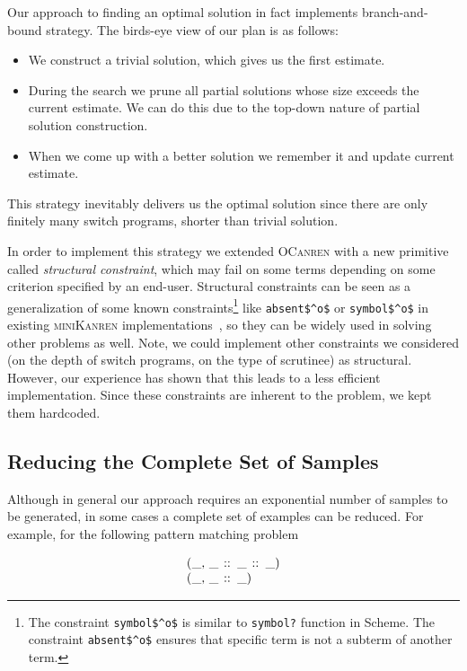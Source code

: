 Our approach to finding an optimal solution in fact implements branch-and-bound strategy. The birds-eye view of our plan is as follows:

\begin{itemize}
\item We construct a trivial solution, which gives us the first estimate.
\item During the search we prune all partial solutions whose size exceeds the current estimate. We can do this due to the top-down nature of partial solution construction.
\item When we come up with a better solution we remember it and update current estimate.
\end{itemize}

\noindent This strategy inevitably delivers us the optimal solution since there are only finitely many switch programs, shorter than trivial solution.

In order to implement this strategy we extended \textsc{OCanren} with a new primitive called \emph{structural constraint}, which may
fail on some terms depending on some criterion specified by an end-user. Structural constraints can be seen as a generalization of
some known constraints\footnote{The constraint  \lstinline|symbol$^o$| is similar to \lstinline{symbol?} function in Scheme. The constraint \lstinline|absent$^o$| ensures that specific term is not a subterm of another term.}
 like \lstinline|absent$^o$| or \lstinline|symbol$^o$|
in existing \textsc{miniKanren} implementations~\cite{Untagged}, 
so they can be widely used in solving other problems as well. Note, we could implement other constraints we considered (on the
depth of switch programs, on the type of scrutinee) as structural.
However, our experience has shown that this leads to
a less efficient implementation. Since these constraints are inherent to the problem, we kept them hardcoded.

\subsection{Reducing the Complete Set of Samples}
\label{sec:reduced-samples}

Although in general our approach requires an exponential number of samples to be generated, in some cases a complete set of examples can be reduced.
For example, for the following pattern matching problem

\[
\begin{array}{l}
\mbox{\lstinline|(_, _ :: _ :: _)|} \\
\mbox{\lstinline|(_, _ :: _)|}
\end{array}
\]

